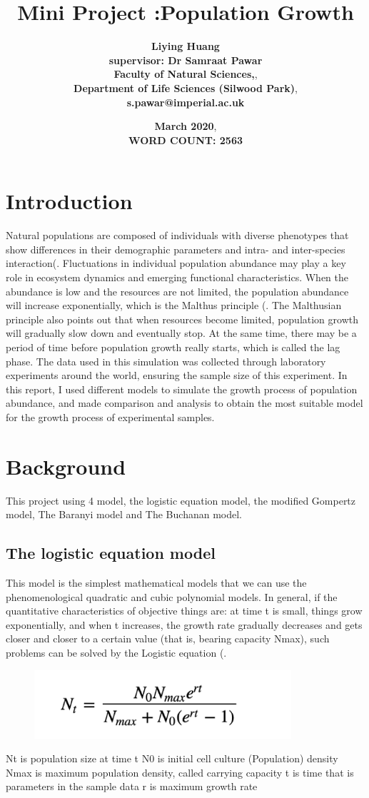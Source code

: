 \documentclass[11pt,a4 paper,title page]{article}
\title{\textbf{Mini Project :Population Growth}}
\author{\large\textbf{Liying Huang}\\
\textbf{supervisor: Dr Samraat Pawar }\\
\textbf{Faculty of Natural Sciences,},\\
\textbf{Department of Life Sciences (Silwood Park)},\\
\textbf{s.pawar@imperial.ac.uk}}
\date{\Large{\textbf{March 2020},\\
\textbf{WORD COUNT: 2563}}}
\begin{document}
\maketitle
\linenumbers 
 \section{Introduction}
  Natural populations are composed of individuals with diverse phenotypes that show differences in their demographic parameters and intra- and inter-species interaction(\cite{bolnick2011intraspecific}. Fluctuations in individual population abundance may play a key role in ecosystem dynamics and emerging functional characteristics. When the abundance is low and the resources are not limited, the population abundance will increase exponentially, which is the Malthus principle (\cite{malthus1992malthus}. The Malthusian principle also points out that when resources become limited, population growth will gradually slow down and eventually stop. At the same time, there may be a period of time before population growth really starts, which is called the lag phase. The data used in this simulation was collected through laboratory experiments around the world, ensuring the sample size of this experiment. In this report, I used different models to simulate the growth process of population abundance, and made comparison and analysis to obtain the most suitable model for the growth process of experimental samples.

  \section{Background}
  This project using 4 model, the logistic equation model, the modified Gompertz model, The Baranyi model and The Buchanan model. 

    \subsection{The logistic equation model}
    This model is the simplest mathematical models that we can use the phenomenological quadratic and cubic polynomial models. In general, if the quantitative characteristics of objective things are: at time t is small, things grow exponentially, and when t increases, the growth rate gradually decreases and gets closer and closer to a certain value (that is, bearing capacity Nmax), such problems can be solved by the Logistic equation (\cite{weisstein2003logistic}.
\begin{figure}[H]
\centering
\includegraphics[height=1in,angle=360]{../picture/figure1.png}
\end{figure}
\hfill\break
Nt is population size at time t
\hfill\break
N0 is initial cell culture (Population) density
\hfill\break
Nmax is maximum population density, called carrying capacity
\hfill\break
t is time that is parameters in the sample data
\hfill\break
r is maximum growth rate 
\end{document}
